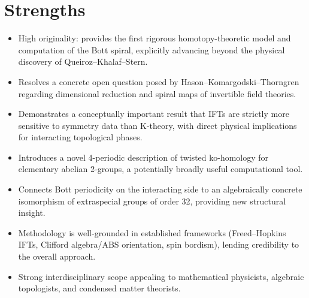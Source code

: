 \documentclass[11pt]{article}
\begin{document}
\section*{Strengths}
\begin{itemize}[leftmargin=*]
  \item High originality: provides the first rigorous homotopy-theoretic model and computation of the Bott spiral, explicitly advancing beyond the physical discovery of Queiroz–Khalaf–Stern.
  \item Resolves a concrete open question posed by Hason–Komargodski–Thorngren regarding dimensional reduction and spiral maps of invertible field theories.
  \item Demonstrates a conceptually important result that IFTs are strictly more sensitive to symmetry data than K-theory, with direct physical implications for interacting topological phases.
  \item Introduces a novel 4-periodic description of twisted ko-homology for elementary abelian 2-groups, a potentially broadly useful computational tool.
  \item Connects Bott periodicity on the interacting side to an algebraically concrete isomorphism of extraspecial groups of order 32, providing new structural insight.
  \item Methodology is well-grounded in established frameworks (Freed–Hopkins IFTs, Clifford algebra/ABS orientation, spin bordism), lending credibility to the overall approach.
  \item Strong interdisciplinary scope appealing to mathematical physicists, algebraic topologists, and condensed matter theorists.
\end{itemize}
\end{document}
